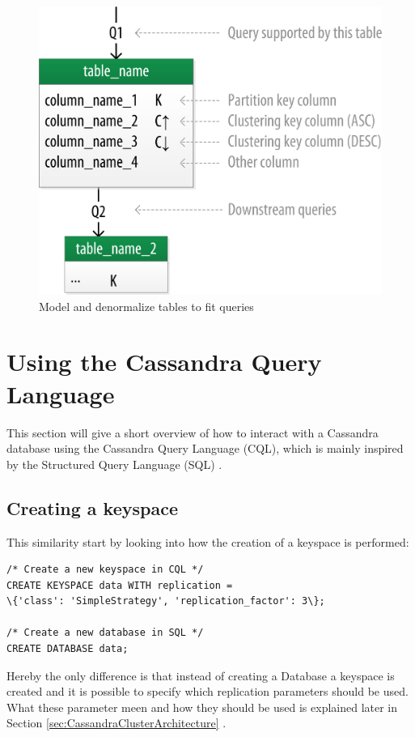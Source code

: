 \begin{figure}[H]
    \centering
    \includegraphics[width=0.75\columnwidth]{img/model_example_primary_key.jpeg}
    \caption{Model and denormalize tables to fit queries \autocite{cassandra_oreilly}}
    \label{fig:cassandra:chebotko}
\end{figure}

\section{Using the Cassandra Query Language}  %
This section will give a short overview of how to interact with a Cassandra database using the Cassandra Query Language (CQL), which is mainly inspired by the Structured Query Language (SQL) \autocite{cqlAlexMeng, newInCQL3, cassandra3cqldocCreateKeystore}.

\subsection {Creating a keyspace}
This similarity start by looking into how the creation of a keyspace is performed:
\begin{verbatim}
/* Create a new keyspace in CQL */
CREATE KEYSPACE data WITH replication =
\{'class': 'SimpleStrategy', 'replication_factor': 3\};

/* Create a new database in SQL */
CREATE DATABASE data;
\end{verbatim}
Hereby the only difference is that instead of creating a Database a keyspace is created and it is possible to specify which replication parameters should be used. What these parameter meen and how they should be used is explained later in Section \ref{sec:CassandraClusterArchitecture} \autocite{cqlAlexMeng}.

